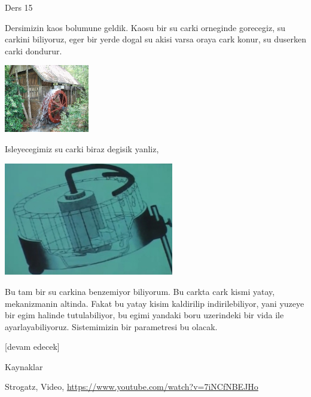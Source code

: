 \documentclass[12pt,fleqn]{article}\usepackage{../../common}
\begin{document}
Ders 15

Dersimizin kaos bolumune geldik. Kaosu bir su carki orneginde gorecegiz, su
carkini biliyoruz, eger bir yerde dogal su akisi varsa oraya cark konur, su
duserken carki dondurur.

\includegraphics[width=10em]{waterwheel.jpg}

Isleyecegimiz su carki biraz degisik yanliz, 

\includegraphics[width=20em]{15_01.jpg}

Bu tam bir su carkina benzemiyor biliyorum. Bu carkta cark kismi yatay,
mekanizmanin altinda. Fakat bu yatay kisim kaldirilip indirilebiliyor, yani
yuzeye bir egim halinde tutulabiliyor, bu egimi yandaki boru uzerindeki bir
vida ile ayarlayabiliyoruz. Sistemimizin bir parametresi bu olacak. 











[devam edecek]

Kaynaklar

Strogatz, Video, \url{https://www.youtube.com/watch?v=7iNCfNBEJHo}
\end{document}
